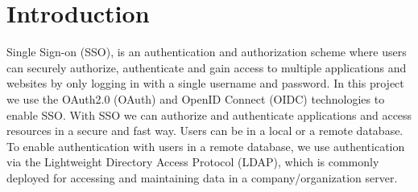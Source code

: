 \section{Introduction}

Single Sign-on (SSO), is an authentication and authorization scheme where users can securely authorize, authenticate and gain access to multiple applications and websites by only logging in with a single username and password. In this project we use the OAuth2.0 (OAuth) and OpenID Connect (OIDC) technologies to enable SSO. With SSO we can authorize and authenticate applications and access resources in a secure and fast way. Users can be in a local or a remote database. To enable authentication with users in a remote database, we use authentication via the Lightweight Directory Access Protocol (LDAP), which is commonly deployed for accessing and maintaining data in a company/organization server.
